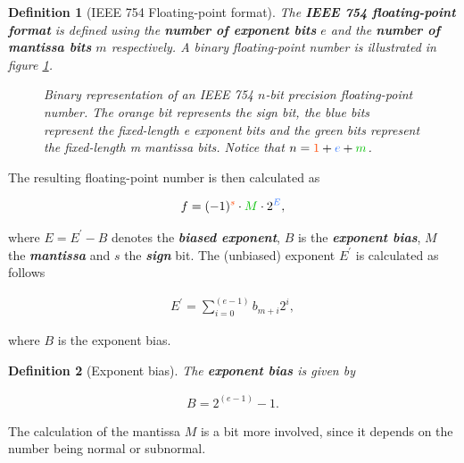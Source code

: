 \documentclass{article}
\theoremstyle{plain} %
\newtheorem{definition}{Definition}[section]
\theoremstyle{convention} %
\theoremstyle{remark} %
\def\df#1{\textbf{\textit{#1}}}
\numberwithin{equation}{section}
\begin{document}
\begin{definition}[IEEE 754 Floating-point format]

The \df{IEEE 754 floating-point format} \cite{ieee754_1985} is defined using the \df{number of exponent bits} $e$ and the \df{number of mantissa bits} $m$ respectively. A binary floating-point number is illustrated in figure \ref{fig:float}.

\begin{figure}[H]
  \caption{Binary representation of an IEEE 754 $n$-bit precision floating-point number. The \textcolor{corange}{orange} bit represents the \textcolor{corange}{sign bit}, the \textcolor{cblue}{blue} bits represent the fixed-length \textcolor{cblue}{e exponent bits} and the \textcolor{cgreen}{green} bits represent the fixed-length \textcolor{cgreen}{m mantissa bits}. Notice that $n = \textcolor{corange}{1} + \textcolor{cblue}{e} + \textcolor{cgreen}{m}$.}
  \label{fig:float}
\end{figure}

\end{definition}

The resulting floating-point number is then calculated as

\begin{align*}
    f = (-1)^{\textcolor{corange}{s}} \cdot \textcolor{cgreen}{M} \cdot 2^{\textcolor{cblue}{E}},
\end{align*}

where $E=E^{\prime}-B$ denotes the \df{biased exponent}, $B$ is the \df{exponent bias}, $M$ the \df{mantissa} and $s$ the \df{sign} bit. The (unbiased) exponent $E^{\prime}$ is calculated as follows

\begin{align}
    E^{\prime} = \sum_{i=0}^{(e-1)} b_{m+i} 2^i, \label{eq:exponent}
\end{align}

where $B$ is the exponent bias.

\begin{definition}[Exponent bias]

The \df{exponent bias} is given by

\begin{align*}
    B = 2^{(e-1)} -1.
\end{align*}

\end{definition}

The calculation of the mantissa $M$ is a bit more involved, since it depends on the number being normal or subnormal.
\end{document}
